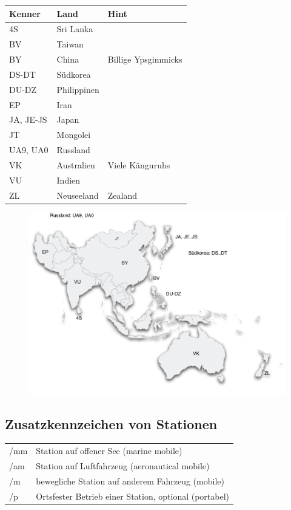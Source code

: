\documentclass[11pt,BCOR=8.5mm]{scrartcl}
\begin{document}
\begin{longtable}{| l | l | l |}
  \hline
  Kenner & Land & Hint \\
  \hline
  \hline
  \endhead
  4S & Sri Lanka & \\
  \hline
  BV & Taiwan & \\
  \hline
  BY & China & Billige Ypsgimmicks\\
  \hline
  DS-DT & Südkorea & \\
  \hline
  DU-DZ & Philippinen & \\
  \hline
  EP & Iran & \\
  \hline
  JA, JE-JS & Japan & \\
  \hline
  JT & Mongolei & \\
  \hline
  UA9, UA0 & Russland & \\
  \hline
  VK & Australien & Viele Känguruhs\\
  \hline
  VU & Indien & \\
  \hline
  ZL & Neuseeland & Zealand\\
  \hline
\end{longtable}



\begin{figure}[htbp]
  \begin{center}
	\includegraphics[width=14cm]{figures/landeskenner-region3}
	\label{fig:landeskenner-region3}
  \end{center}
\end{figure}


\subsection{Zusatzkennzeichen von Stationen}\label{sub:zusatzkennzeichen}
\begin{table}[h]
  \centering
\begin{tabular}{|l|l|}
  \hline
  /mm & Station auf offener See (marine mobile) \\
  /am & Station auf Luftfahrzeug (aeronautical mobile) \\
  /m & bewegliche Station auf anderem Fahrzeug (mobile) \\
  /p & Ortsfester Betrieb einer Station, optional (portabel) \\
  \hline
\end{tabular}
\end{table}
\end{document}
